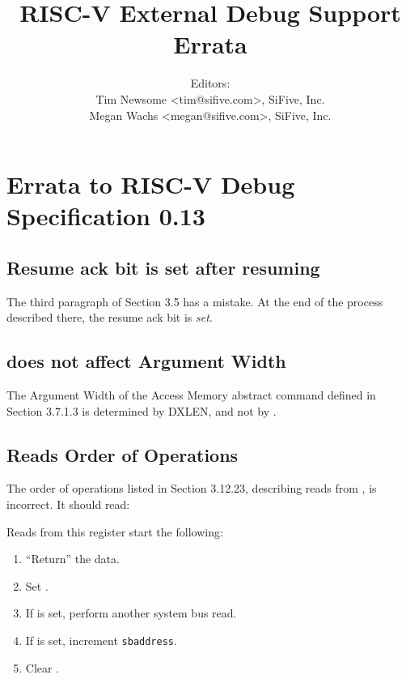 \documentclass[twoside,11pt]{article}
\newenvironment{steps}[1]
  {
     \vspace{1ex}
     \noindent #1
     \begin{enumerate}[nolistsep]
  }
  {
     \end{enumerate}
     \vspace{1ex}
 }
\begin{document}
\title{RISC-V External Debug Support Errata\\
\GITHash
}
\author{Editors: \\
Tim Newsome \textless tim@sifive.com\textgreater, SiFive, Inc. \\
Megan Wachs \textless megan@sifive.com\textgreater, SiFive, Inc.}
\date{\GITAuthorDate}
\maketitle

\section{Errata to RISC-V Debug Specification 0.13}

\subsection{Resume ack bit is set after resuming}

The third paragraph of Section 3.5 has a mistake. At the end of the process
described there, the resume ack bit is \emph{set}.

\subsection{\Faamsize does not affect Argument Width}

The Argument Width of the Access Memory abstract command defined in Section
3.7.1.3 is determined by DXLEN, and not by \Faamsize.

\subsection{\Rsbdatazero Reads Order of Operations}

The order of operations listed in Section 3.12.23, describing reads from
\Rsbdatazero, is incorrect. It should read:

\begin{steps}{Reads from this register start the following:}
    \item ``Return'' the data.
    \item Set \Fsbbusy.
    \item If \Fsbreadondata is set, perform another system bus read.
    \item If \Fsbautoincrement is set, increment {\tt sbaddress}.
    \item Clear \Fsbbusy.
\end{steps}
\end{document}
